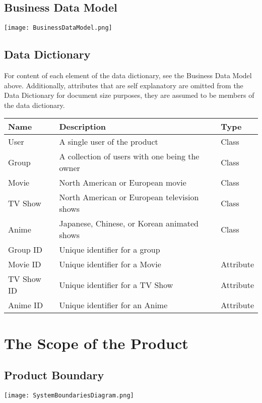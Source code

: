 \documentclass[12pt]{article}
\begin{document}
\subsection{Business Data Model}
\begin{center}
	\texttt{[image: BusinessDataModel.png]}
\end{center}

\subsection{Data Dictionary}
For content of each element of the data dictionary, see the Business Data Model above.
Additionally, attributes that are self explanatory are omitted from the Data Dictionary for document size purposes, they are assumed to be members of the data dictionary.

\begin{tabularx}{\textwidth}{|p{3cm}|p{10cm}|X|}
 	\hline {\bf Name} & {\bf Description} & {\bf Type}\\
	\hline
	User & A single user of the product & Class \\
	Group & A collection of users with one being the owner & Class \\
	Movie & North American or European movie & Class\\
	TV Show & North American or European television shows & Class\\
	Anime & Japanese, Chinese, or Korean animated shows & Class\\
	Group ID & Unique identifier for a group & \\
	Movie ID & Unique identifier for a Movie & Attribute \\
	TV Show ID & Unique identifier for a TV Show & Attribute \\
	Anime ID & Unique identifier for an Anime & Attribute \\
	\hline
\end{tabularx}

\section{The Scope of the Product}


\subsection{Product Boundary}
\texttt{[image: SystemBoundariesDiagram.png]}
\end{document}
